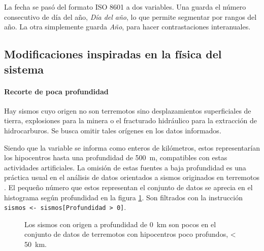 \documentclass[a4paper]{report}
\begin{document}
La fecha se pasó del formato ISO 8601 a dos variables.
Una guarda el número consecutivo de día del año, \emph{Día del año}, lo que permite segmentar por rangos del año.
La otra simplemente guarda \emph{Año}, para hacer contrastaciones interanuales.


\subsection{Modificaciones inspiradas en la física del sistema}


\paragraph{Recorte de poca profundidad}

Hay sismos cuyo origen no son terremotos sino desplazamientos superficiales de tierra, explosiones para la minera o el fracturado hidráulico para la extracción de hidrocarburos.
Se busca omitir tales orígenes en los datos informados.

Siendo que la variable se informa como enteros de kilómetros, estos representarían los hipocentros hasta una profundidad de \SI{500}{\metre}, compatibles con estas actividades artificiales.
La omisión de estas fuentes a baja profundidad es una práctica usual en el análisis de datos orientados a sismos originados en terremotos \cite{hu_applying_2024}.
El pequeño número que estos representan  el conjunto de datos se aprecia en el histograma según profundidad en la figura \ref{fig:histograma_profundidad50km}.
Son filtrados con la instrucción \verb'sismos <- sismos[Profundidad > 0]'.
\begin{figure}[!ht]
	\centering
	
  \vspace{-1cm} %
	\caption{Los sismos con origen a profundidad de \SI{0}{\kilo\metre} son pocos en el conjunto de datos de terremotos con hipocentros poco profundos, < \SI{50}{\kilo\metre}.}
	\label{fig:histograma_profundidad50km}
\end{figure}
\end{document}

